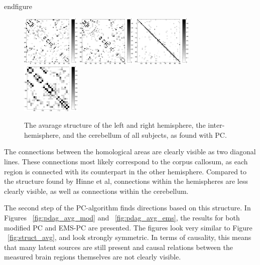 \documentclass[a4paper, 10pt, english, onecolumn]{article}
\begin{document}
end{figure}

\begin{figure}[h!]
  \centering
  \includegraphics[width=0.25\textwidth]{images/struct_hemisphere_1_45}
  \includegraphics[width=0.25\textwidth]{images/struct_hemisphere_46_90}
  \includegraphics[width=0.25\textwidth]{images/struct_inter_hemisphere}
  \includegraphics[width=0.25\textwidth]{images/struct_cerebellum}  
  \caption{The avarage structure of the left and right hemisphere, the inter-hemisphere, and the cerebellum of all subjects, as found with PC.}
  \label{fig:struct_apart}
\end{figure}

The connections between the homological areas are clearly visible as two diagonal lines.
These connections most likely correspond to the corpus callosum, as each region is connected with its counterpart in the other hemisphere.
Compared to the structure found by Hinne et al, connections within the hemispheres are less clearly visible, as well as connections within the cerebellum.

The second step of the PC-algorithm finds directions based on this structure.
In Figures ~\ref{fig:pdag_avg_mod} and ~\ref{fig:pdag_avg_ems}, the results for both modified PC and EMS-PC are presented.
The figures look very similar to Figure ~\ref{fig:struct_avg}, and look strongly symmetric.
In terms of causality, this means that many latent sources are still present and causal relations between the measured brain regions themselves are not clearly visible.
\end{document}
